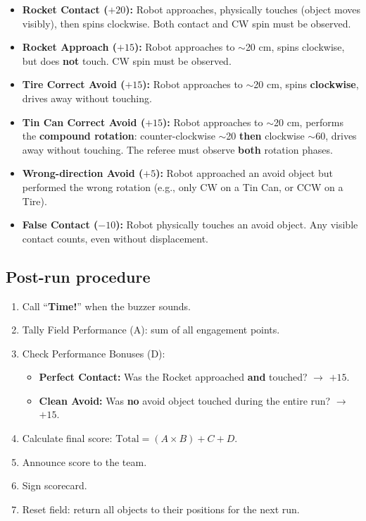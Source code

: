 \documentclass[a4]{article}
\begin{document}
\begin{itemize}
    \item \textbf{Rocket Contact ($+20$):} Robot approaches, physically touches (object moves visibly), then spins clockwise. Both contact and CW spin must be observed.

    \item \textbf{Rocket Approach ($+15$):} Robot approaches to $\sim$20 cm, spins clockwise, but does \textbf{not} touch. CW spin must be observed.

    \item \textbf{Tire Correct Avoid ($+15$):} Robot approaches to $\sim$20 cm, spins \textbf{clockwise}, drives away without touching.

    \item \textbf{Tin Can Correct Avoid ($+15$):} Robot approaches to $\sim$20 cm, performs the \textbf{compound rotation}: counter-clockwise $\sim$20\textdegree{} \textbf{then} clockwise $\sim$60\textdegree, drives away without touching. The referee must observe \textbf{both} rotation phases.

    \item \textbf{Wrong-direction Avoid ($+5$):} Robot approached an avoid object but performed the wrong rotation (e.g., only CW on a Tin Can, or CCW on a Tire).

    \item \textbf{False Contact ($-10$):} Robot physically touches an avoid object. Any visible contact counts, even without displacement.
\end{itemize}

\subsection*{Post-run procedure}

\begin{enumerate}
    \item Call ``\textbf{Time!}'' when the buzzer sounds.
    \item Tally Field Performance (A): sum of all engagement points.
    \item Check Performance Bonuses (D):
    \begin{itemize}
        \item \textbf{Perfect Contact:} Was the Rocket approached \textbf{and} touched? $\rightarrow$ $+15$.
        \item \textbf{Clean Avoid:} Was \textbf{no} avoid object touched during the entire run? $\rightarrow$ $+15$.
    \end{itemize}
    \item Calculate final score: $\text{Total} = (A \times B) + C + D$.
    \item Announce score to the team.
    \item Sign scorecard.
    \item Reset field: return all objects to their positions for the next run.
\end{enumerate}
\end{document}

